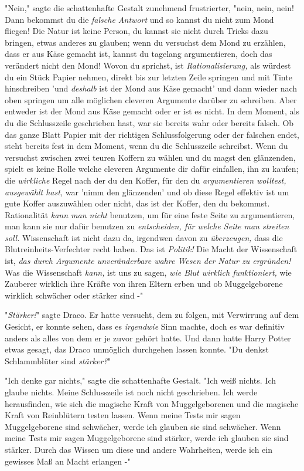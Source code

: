 {"Nein," sagte die schattenhafte Gestalt zunehmend frustrierter, "nein, nein, nein! Dann bekommst du die \emph{falsche Antwort} und so kannst du nicht zum Mond fliegen! Die Natur ist keine Person, du kannst sie nicht durch Tricks dazu bringen, etwas anderes zu glauben; wenn du versuchst dem Mond zu erzählen, dass er aus Käse gemacht ist, kannst du tagelang argumentieren, doch das verändert nicht den Mond! Wovon du sprichst, ist \emph{Rationalisierung,} als würdest du ein Stück Papier nehmen, direkt bis zur letzten Zeile springen und mit Tinte hinschreiben 'und \emph{deshalb} ist der Mond aus Käse gemacht' und dann wieder nach oben springen um alle möglichen cleveren Argumente darüber zu schreiben. Aber entweder ist der Mond aus Käse gemacht oder er ist es nicht. In dem Moment, als du die Schlusszeile geschrieben hast, war sie bereits wahr oder bereits falsch. Ob das ganze Blatt Papier mit der richtigen Schlussfolgerung oder der falschen endet, steht bereits fest in dem Moment, wenn du die Schlusszeile schreibst. Wenn du versuchst zwischen zwei teuren Koffern zu wählen und du magst den glänzenden, spielt es keine Rolle welche cleveren Argumente dir dafür einfallen, ihn zu kaufen; die \emph{wirkliche} Regel nach der du den Koffer, für den du \emph{argumentieren wolltest, ausgewählt hast,} war 'nimm den glänzenden' und ob diese Regel effektiv ist um gute Koffer auszuwählen oder nicht, das ist der Koffer, den du bekommst. Rationalität \emph{kann man nicht} benutzen, um für eine feste Seite zu argumentieren, man kann sie nur dafür benutzen zu \emph{entscheiden, für welche Seite man streiten soll.} Wissenschaft ist nicht dazu da, irgendwen davon zu \emph{überzeugen,} dass die Blutreinheits-Verfechter recht haben. Das ist \emph{Politik!} Die Macht der Wissenschaft ist, \emph{das durch Argumente unveränderbare wahre Wesen der Natur zu ergründen!} Was die Wissenschaft \emph{kann,} ist uns zu sagen, \emph{wie Blut wirklich funktioniert,} wie Zauberer wirklich ihre Kräfte von ihren Eltern erben und ob Muggelgeborene wirklich schwächer oder stärker sind -"

"\emph{Stärker!}" sagte Draco. Er hatte versucht, dem zu folgen, mit Verwirrung auf dem Gesicht, er konnte sehen, dass es \emph{irgendwie} Sinn machte, doch es war definitiv anders als alles von dem er je zuvor gehört hatte. Und dann hatte Harry Potter etwas gesagt, das Draco unmöglich durchgehen lassen konnte. "Du denkst Schlammblüter sind \emph{stärker?}"

"Ich denke gar nichts," sagte die schattenhafte Gestalt. "Ich weiß nichts. Ich glaube nichts. Meine Schlusszeile ist noch nicht geschrieben. Ich werde herausfinden, wie sich die magische Kraft von Muggelgeborenen und die magische Kraft von Reinblütern testen lassen. Wenn meine Tests mir sagen Muggelgeborene sind schwächer, werde ich glauben sie sind schwächer. Wenn meine Tests mir sagen Muggelgeborene sind stärker, werde ich glauben sie sind stärker. Durch das Wissen um diese und andere Wahrheiten, werde ich ein gewisses Maß an Macht erlangen -"

}
